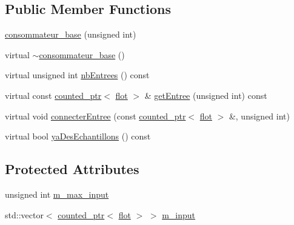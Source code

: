 \subsection*{Public Member Functions}
\begin{DoxyCompactItemize}
\item 
\hyperlink{classconsommateur__base_a3a96b41f2a05573c8be4a820462f73dc}{consommateur\-\_\-base} (unsigned int)
\item 
virtual \hyperlink{classconsommateur__base_a8c5da6cd2134ad9cc76a8d8ddf303b91}{$\sim$consommateur\-\_\-base} ()
\item 
virtual unsigned int \hyperlink{classconsommateur__base_a71244a18e367c260320ab220c416d83a}{nb\-Entrees} () const 
\item 
virtual const \hyperlink{classcounted__ptr}{counted\-\_\-ptr}$<$ \hyperlink{classflot}{flot} $>$ \& \hyperlink{classconsommateur__base_aaa04503aa9b028729a0dbaf0d5a6d63c}{get\-Entree} (unsigned int) const 
\item 
virtual void \hyperlink{classconsommateur__base_a273d1899ba7e05e8651b4cca6aa35b1d}{connecter\-Entree} (const \hyperlink{classcounted__ptr}{counted\-\_\-ptr}$<$ \hyperlink{classflot}{flot} $>$ \&, unsigned int)
\item 
virtual bool \hyperlink{classconsommateur__base_a19f135d483c30324526d63c18a536f36}{ya\-Des\-Echantillons} () const 
\end{DoxyCompactItemize}
\subsection*{Protected Attributes}
\begin{DoxyCompactItemize}
\item 
unsigned int \hyperlink{classconsommateur__base_af75625bb7dc752ff9aa173c6aff50059}{m\-\_\-max\-\_\-input}
\item 
std\-::vector$<$ \hyperlink{classcounted__ptr}{counted\-\_\-ptr}$<$ \hyperlink{classflot}{flot} $>$ $>$ \hyperlink{classconsommateur__base_a061094bb0041f748ff88d94b1e503087}{m\-\_\-input}
\end{DoxyCompactItemize}


